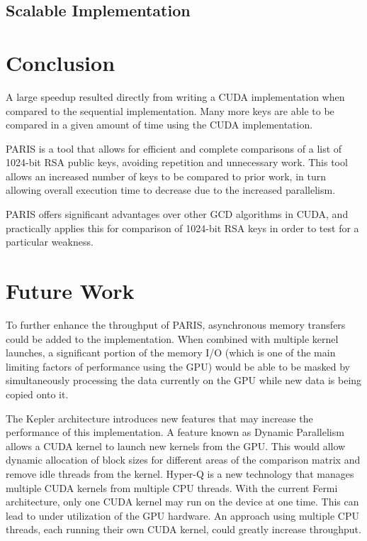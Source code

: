 \documentclass[smallextended]{svjour3}       %
\begin{document}
\subsection{Scalable Implementation}
\label{scaleimpl}


\section{Conclusion}
\label{sec:concl}
A large speedup resulted directly from writing a CUDA 
implementation when compared to the sequential implementation. Many 
more keys are able to be compared in a given amount of time using the CUDA
implementation. 

PARIS is a tool that allows for efficient and complete comparisons of a list of
1024-bit RSA public keys, avoiding repetition and unnecessary work. This tool
allows an increased number of keys to be compared to prior work, in turn
allowing overall execution time to decrease due to the increased parallelism.

PARIS offers significant advantages over other GCD algorithms in CUDA, and
practically applies this for comparison of 1024-bit RSA keys in order to test
for a particular weakness.


\section{Future Work}
\label{sec:future}
To further enhance the throughput of PARIS, asynchronous memory transfers could
be added to the implementation. When combined with multiple kernel launches, a
significant portion of the memory I/O (which is one of the main limiting
factors of performance using the GPU) would be able to be masked by
simultaneously processing the data currently on the GPU while new data is being
copied onto it.

The Kepler architecture introduces new features that may increase the 
performance of this implementation. A feature known as Dynamic Parallelism 
allows a CUDA kernel to launch new kernels from the GPU. This would allow
dynamic allocation of block sizes for different areas of the comparison matrix
and remove idle threads from the kernel. Hyper-Q is a new technology that
manages multiple CUDA kernels from multiple CPU threads. With the current Fermi
architecture, only one CUDA kernel may run on the device at one time. This can
lead to under utilization of the GPU hardware. An approach using multiple CPU
threads, each running their own CUDA kernel, could greatly increase throughput.
\end{document}
